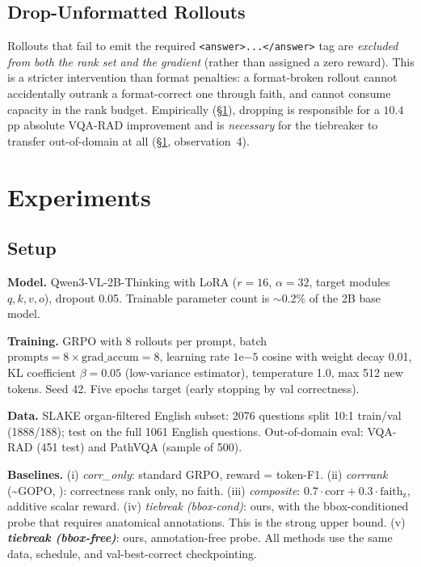 \documentclass[11pt]{article}
\begin{document}
\subsection{Drop-Unformatted Rollouts}

Rollouts that fail to emit the required \verb|<answer>...</answer>| tag
are \emph{excluded from both the rank set and the gradient} (rather than
assigned a zero reward). This is a stricter intervention than format
penalties: a format-broken rollout cannot accidentally outrank a
format-correct one through faith, and cannot consume capacity in the rank
budget. Empirically (\S\ref{sec:exp}), dropping is responsible for a
$10.4$\,pp absolute VQA-RAD improvement and is \emph{necessary} for the
tiebreaker to transfer out-of-domain at all (\S\ref{sec:exp},
observation~4).

\section{Experiments}
\label{sec:exp}

\subsection{Setup}

\textbf{Model.} Qwen3-VL-2B-Thinking with LoRA ($r=16$, $\alpha=32$,
target modules $q,k,v,o$), dropout 0.05. Trainable parameter count is
$\sim$0.2\% of the 2B base model.

\textbf{Training.} GRPO with 8 rollouts per prompt, batch
$\text{prompts}=8 \times \text{grad\_accum}=8$, learning rate $1\mathrm{e}{-5}$ cosine
with weight decay 0.01, KL coefficient $\beta = 0.05$ (low-variance
estimator), temperature 1.0, max 512 new tokens. Seed 42. Five epochs
target (early stopping by val correctness).

\textbf{Data.} SLAKE organ-filtered English subset: 2076 questions split
10:1 train/val (1888/188); test on the full 1061 English questions.
Out-of-domain eval: VQA-RAD (451 test) and PathVQA (sample of 500).

\textbf{Baselines.}
(i) \emph{corr\_only}: standard GRPO, reward = token-F1.
(ii) \emph{corrrank} (\textasciitilde GOPO, \citealp{gopo}):
correctness rank only, no faith.
(iii) \emph{composite}: $0.7 \cdot \text{corr} + 0.3 \cdot \text{faith}_{\text{z}}$,
additive scalar reward.
(iv) \emph{tiebreak (bbox-cond)}: ours, with the bbox-conditioned probe
that requires anatomical annotations. This is the strong upper bound.
(v) \textbf{\emph{tiebreak (bbox-free)}}: ours, annotation-free probe.
All methods use the same data, schedule, and val-best-correct
checkpointing.
\end{document}
